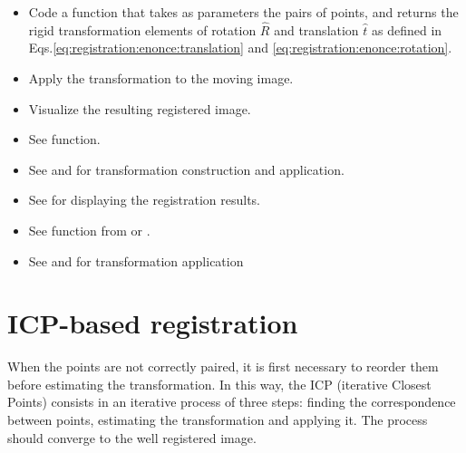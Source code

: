 \begin{qbox}
\begin{itemize}\item Code a function that takes as parameters the pairs of points, and returns the rigid transformation elements of rotation $\hat{R}$ and translation $\hat{t}$ as defined in Eqs.\ref{eq:registration:enonce:translation} and \ref{eq:registration:enonce:rotation}. 
	\item Apply the transformation to the moving image.
	\item Visualize the resulting registered image.
	\end{itemize}
\end{qbox}

\begin{mcomment}
\begin{mremark}
\begin{itemize}
 \item See  function.
 \item See  and  for transformation construction and application.
 \item See  for displaying the registration results.
\end{itemize}
\end{mremark}
\end{mcomment}

\begin{pcomment}
\begin{premark}
 \begin{itemize}\item See  function from  or .
  \item See  and  for transformation application
 \end{itemize}

 
\end{premark}
\end{pcomment}


\section{ICP-based registration}
When the points are not correctly paired, it is first necessary to reorder them before estimating the transformation. In this way, the ICP (iterative Closest Points) consists in an iterative process of three steps: finding the correspondence between points, estimating the transformation and applying it. The process should converge to the well registered image.

